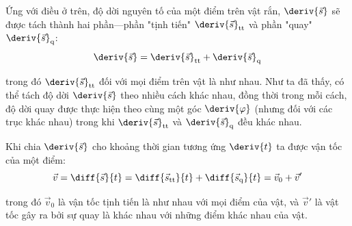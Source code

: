 Ứng với điều ở trên, độ dời nguyên tố của một điểm trên vật rắn, $\deriv{\vec{s}}$ sẽ được tách thành hai phần---phần "tịnh tiến" $\deriv{\vec{s}}_{\text{tt}}$ và phần "quay" $\deriv{\vec{s}}_{\text{q}}$:
\begin{equation*}
\deriv{\vec{s}} = \deriv{\vec{s}}_{\text{tt}} + \deriv{\vec{s}}_{\text{q}}
\end{equation*}

\noindent
trong đó $\deriv{\vec{s}}_{\text{tt}}$ đối với mọi điểm trên vật là như nhau. Như ta đã thấy, có thể tách độ dời $\deriv{\vec{s}}$ theo nhiều cách khác nhau, đồng thời trong mỗi cách, độ dời quay được thực hiện theo cùng một góc $\deriv{\varphi}$ (nhưng đối với các trục khác nhau) trong khi $\deriv{\vec{s}}_{\text{tt}}$ và $\deriv{\vec{s}}_{\text{q}}$ đều khác nhau.

Khi chia $\deriv{\vec{s}}$ cho khoảng thời gian tương ứng $\deriv{t}$ ta được vận tốc của một điểm:
\begin{equation*}
\vec{v} = \diff{\vec{s}}{t} = \diff{\vec{s}_{\text{tt}}}{t}+\diff{\vec{s}_{\text{q}}}{t}= \vec{v}_0 + \vec{v}'
\end{equation*}

\noindent
trong đó $\vec{v}_0$ là vận tốc tịnh tiến là như nhau với mọi điểm của vật, và $\vec{v}'$ là vật tốc gây ra bởi sự quay là khác nhau với những điểm khác nhau của vật.

